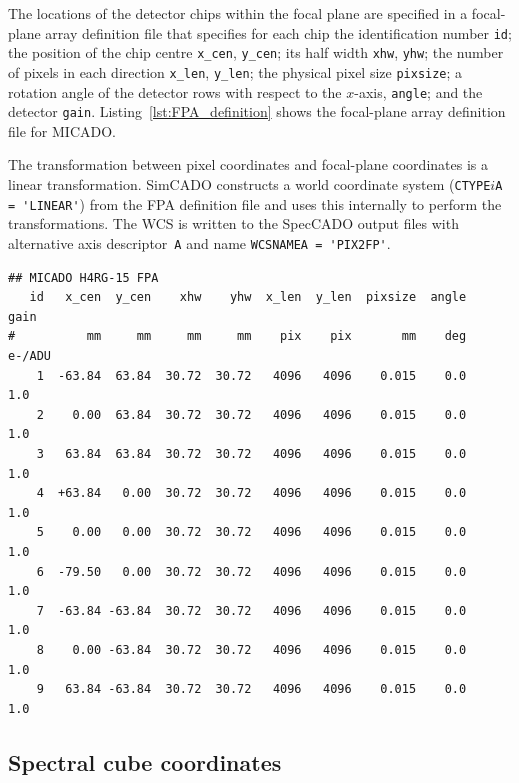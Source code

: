 \documentclass[a4paper,twoside,11pt]{article}
\newcommand{\micron}{\upmu\mathrm{m}}
\begin{document}
The locations of the detector chips within the focal plane are
specified in a focal-plane array definition file that specifies for
each chip the identification number \lstinline{id}; the position of
the chip centre \lstinline{x_cen}, \lstinline{y_cen}; its half width
\lstinline{xhw}, \lstinline{yhw}; the number of pixels in each
direction \lstinline{x_len}, \lstinline{y_len}; the physical pixel
size \lstinline{pixsize}; a rotation angle of the detector rows with
respect to the $x$-axis, \lstinline{angle}; and the detector
\lstinline{gain}.  Listing~\ref{lst:FPA_definition} shows the
focal-plane array definition file for MICADO.

The transformation between pixel coordinates and focal-plane
coordinates is a linear transformation. SimCADO constructs a world
coordinate system (\lstinline{CTYPE}$i$\lstinline{A = 'LINEAR'}) from
the FPA definition file and uses this internally to perform the
transformations. The WCS is written to the SpecCADO output files with
alternative axis descriptor~\lstinline{A} and name
\lstinline{WCSNAMEA = 'PIX2FP'}.


\begin{lstlisting}[style=csh,float, caption=Focal plane array definition file for MICADO with nine HAWAII4RG chips with $15\,\micron$ pixels, label=lst:FPA_definition]
## MICADO H4RG-15 FPA
   id   x_cen  y_cen    xhw    yhw  x_len  y_len  pixsize  angle    gain
#          mm     mm     mm     mm    pix    pix       mm    deg  e-/ADU
    1  -63.84  63.84  30.72  30.72   4096   4096    0.015    0.0     1.0
    2    0.00  63.84  30.72  30.72   4096   4096    0.015    0.0     1.0
    3   63.84  63.84  30.72  30.72   4096   4096    0.015    0.0     1.0
    4  +63.84   0.00  30.72  30.72   4096   4096    0.015    0.0     1.0
    5    0.00   0.00  30.72  30.72   4096   4096    0.015    0.0     1.0
    6  -79.50   0.00  30.72  30.72   4096   4096    0.015    0.0     1.0
    7  -63.84 -63.84  30.72  30.72   4096   4096    0.015    0.0     1.0
    8    0.00 -63.84  30.72  30.72   4096   4096    0.015    0.0     1.0
    9   63.84 -63.84  30.72  30.72   4096   4096    0.015    0.0     1.0
\end{lstlisting}


\subsection{Spectral cube coordinates}
\label{ssec:cube_coordinates}
\end{document}
